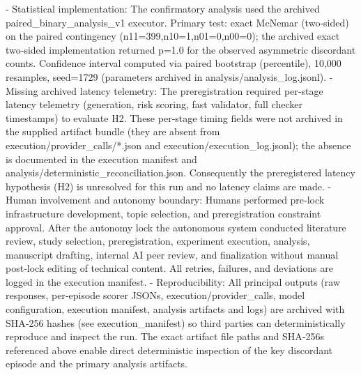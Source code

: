 \documentclass[conference]{IEEEtran}
\begin{document}
- Statistical implementation: The confirmatory analysis used the archived paired\_binary\_analysis\_v1 executor. Primary test: exact McNemar (two‑sided) on the paired contingency (n11=399,n10=1,n01=0,n00=0); the archived exact two‑sided implementation returned p=1.0 for the observed asymmetric discordant counts. Confidence interval computed via paired bootstrap (percentile), 10,000 resamples, seed=1729 (parameters archived in analysis/analysis\_log.jsonl).
- Missing archived latency telemetry: The preregistration required per‑stage latency telemetry (generation, risk scoring, fast validator, full checker timestamps) to evaluate H2. These per‑stage timing fields were not archived in the supplied artifact bundle (they are absent from execution/provider\_calls/*.json and execution/execution\_log.jsonl); the absence is documented in the execution manifest and analysis/deterministic\_reconciliation.json. Consequently the preregistered latency hypothesis (H2) is unresolved for this run and no latency claims are made.
- Human involvement and autonomy boundary: Humans performed pre‑lock infrastructure development, topic selection, and preregistration constraint approval. After the autonomy lock the autonomous system conducted literature review, study selection, preregistration, experiment execution, analysis, manuscript drafting, internal AI peer review, and finalization without manual post‑lock editing of technical content. All retries, failures, and deviations are logged in the execution manifest.
- Reproducibility: All principal outputs (raw responses, per‑episode scorer JSONs, execution/provider\_calls, model configuration, execution manifest, analysis artifacts and logs) are archived with SHA‑256 hashes (see execution\_manifest) so third parties can deterministically reproduce and inspect the run. The exact artifact file paths and SHA‑256s referenced above enable direct deterministic inspection of the key discordant episode and the primary analysis artifacts.
\end{document}
